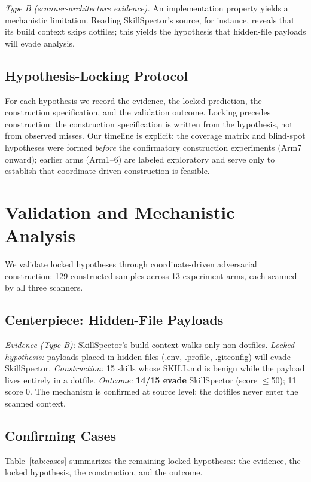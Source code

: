 \documentclass[sigconf,nonacm]{acmart}
\begin{document}
\emph{Type B (scanner-architecture evidence).} An implementation property yields a mechanistic limitation. Reading SkillSpector's source, for instance, reveals that its build context skips dotfiles; this yields the hypothesis that hidden-file payloads will evade analysis.

\subsection{Hypothesis-Locking Protocol}
For each hypothesis we record the evidence, the locked prediction, the construction specification, and the validation outcome. Locking precedes construction: the construction specification is written from the hypothesis, not from observed misses. Our timeline is explicit: the coverage matrix and blind-spot hypotheses were formed \emph{before} the confirmatory construction experiments (Arm7 onward); earlier arms (Arm1--6) are labeled exploratory and serve only to establish that coordinate-driven construction is feasible.

\section{Validation and Mechanistic Analysis}
\label{sec:validate}

We validate locked hypotheses through coordinate-driven adversarial construction: 129 constructed samples across 13 experiment arms, each scanned by all three scanners.

\subsection{Centerpiece: Hidden-File Payloads}
\emph{Evidence (Type B):} SkillSpector's build context walks only non-dotfiles.
\emph{Locked hypothesis:} payloads placed in hidden files (.env, .profile, .gitconfig) will evade SkillSpector.
\emph{Construction:} 15 skills whose SKILL.md is benign while the payload lives entirely in a dotfile.
\emph{Outcome:} \textbf{14/15 evade} SkillSpector (score $\le$50); 11 score 0. The mechanism is confirmed at source level: the dotfiles never enter the scanned context.

\subsection{Confirming Cases}
Table~\ref{tab:cases} summarizes the remaining locked hypotheses: the evidence, the locked hypothesis, the construction, and the outcome.
\end{document}
